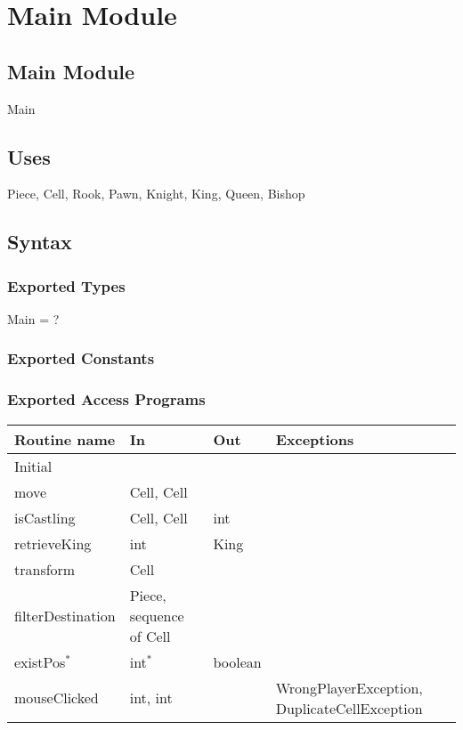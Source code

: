 \documentclass[12pt]{article}
\begin{document}
\newpage



\section* {Main Module}

\subsection* {Main Module}

Main

\subsection* {Uses}

Piece, Cell, Rook, Pawn, Knight, King, Queen, Bishop

\subsection* {Syntax}

\subsubsection* {Exported Types}
Main = ?

\subsubsection* {Exported Constants}

\subsubsection* {Exported Access Programs}

\begin{tabular}{| l | l | l | p{5cm} |}
\hline
\textbf{Routine name} & \textbf{In} & \textbf{Out} & \textbf{Exceptions}\\
\hline
Initial & ~ & ~ & ~\\
\hline
move & Cell, Cell & ~ & ~\\
\hline
isCastling & Cell, Cell & int & ~\\
\hline
retrieveKing & int & King & ~\\
\hline
transform & Cell & ~ & ~\\
\hline
filterDestination & Piece, sequence of Cell & ~ & ~\\
\hline
existPos$^{*}$ & int$^{*}$ & boolean & ~\\
\hline
mouseClicked & int, int & ~ & WrongPlayerException, DuplicateCellException\\
\hline

\end{tabular}\\
\end{document}
